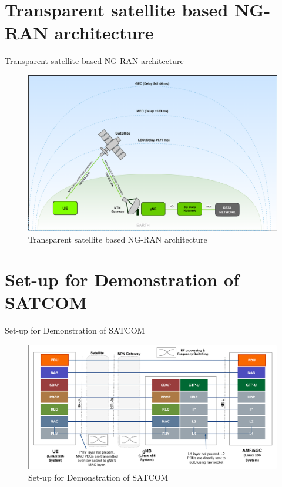 \documentclass[xcolor=table]{beamer}
\begin{document}
\section{Transparent satellite based NG-RAN architecture}
\begin{frame}{Transparent satellite based NG-RAN architecture}
    \begin{figure}[h!]
  		\centering
  		\includegraphics[width=\linewidth]{./figs/SATCOM_figure.png}
  		\caption{Transparent satellite based NG-RAN architecture}
  		\label{SATCOM_figure}
	\end{figure}
  
\end{frame} 


\section{Set-up for Demonstration of SATCOM}
\begin{frame}{Set-up for Demonstration of SATCOM}
    \begin{figure}[h!]
  		\centering
  		\includegraphics[width=\linewidth]{./figs/SATCOM_setup1.png}
  		\caption{Set-up for Demonstration of SATCOM}
  		\label{SATCOM_setup}
	\end{figure}
\end{frame} 
\end{document}
